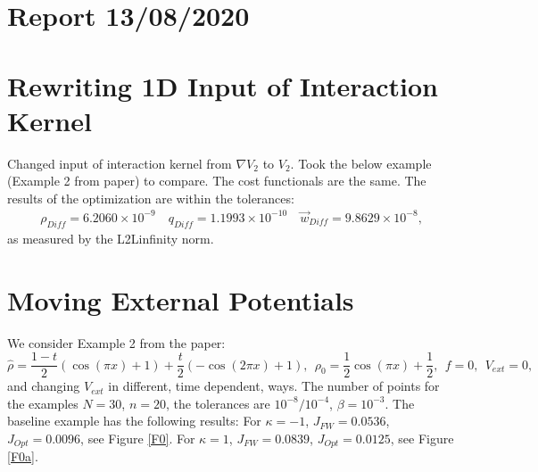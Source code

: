 \documentclass[11pt, a4paper]{article}
\theoremstyle{definition}
\begin{document}
	\section*{Report 13/08/2020}
	\section{Rewriting 1D Input of Interaction Kernel}
	Changed input of interaction kernel from $\nabla V_2$ to $V_2$. Took the below example (Example 2 from paper) to compare.
	The cost functionals are the same.
	The results of the optimization are within the tolerances:
	\begin{align*}
		\rho_{Diff} = 6.2060 \times 10^{-9} \quad q_{Diff} = 1.1993 \times 10^{-10} \quad \vec w_{Diff} = 9.8629 \times 10^{-8},
	\end{align*}
	as measured by the L2Linfinity norm. 
\section{Moving External Potentials}
We consider Example 2 from the paper:
\begin{equation*}
\widehat \rho = \frac{1-t}{2}\left(\cos(\pi x) + 1 \right) + \frac{t}{2}\left(-\cos(2 \pi x) + 1 \right), \ \
\rho_{0} = \frac{1}{2}\cos(\pi x) + \frac{1}{2},\ \
f =0,\ \
V_{ext} =0,
\end{equation*}
and changing $V_{ext}$ in different, time dependent, ways. The number of points for the examples $N=30$, $n=20$, the tolerances are $10^{-8}/10^{-4}$, $\beta = 10^{-3}$.
The baseline example has the following results:
For $\kappa = -1$, $J_{FW} = 0.0536$, $J_{Opt} = 0.0096$, see Figure \ref{F0}.
For $\kappa = 1$, $J_{FW} = 0.0839$, $J_{Opt} = 0.0125$, see Figure \ref{F0a}.
\end{document}
